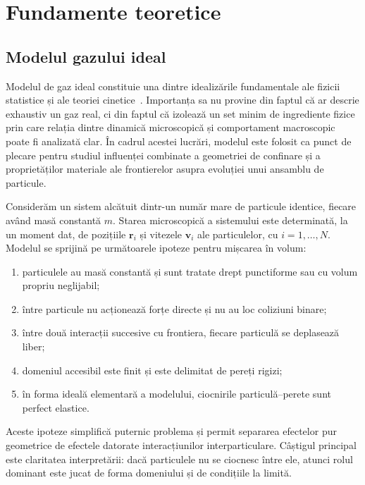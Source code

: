 \documentclass[12pt,openright,twoside]{book}
\begin{document}
\chapter{Fundamente teoretice}
\label{sec:fundamente}

\section{Modelul gazului ideal}

Modelul de gaz ideal constituie una dintre idealizările fundamentale ale fizicii statistice și ale teoriei cinetice~\cite{reif2009,cercignani1988,plavitu_termice,stefan_termice,ciobanu_statistica}. Importanța sa nu provine din faptul că ar descrie exhaustiv un gaz real, ci din faptul că izolează un set minim de ingrediente fizice prin care relația dintre dinamică microscopică și comportament macroscopic poate fi analizată clar. În cadrul acestei lucrări, modelul este folosit ca punct de plecare pentru studiul influenței combinate a geometriei de confinare și a proprietăților materiale ale frontierelor asupra evoluției unui ansamblu de particule.

Considerăm un sistem alcătuit dintr-un număr mare de particule identice, fiecare având masă constantă $m$. Starea microscopică a sistemului este determinată, la un moment dat, de pozițiile $\mathbf{r}_i$ și vitezele $\mathbf{v}_i$ ale particulelor, cu $i=1,\dots,N$. Modelul se sprijină pe următoarele ipoteze pentru mișcarea în volum:

\begin{enumerate}[label=\arabic*.]
    \item particulele au masă constantă și sunt tratate drept punctiforme sau cu volum propriu neglijabil;
    \item între particule nu acționează forțe directe și nu au loc coliziuni binare;
    \item între două interacții succesive cu frontiera, fiecare particulă se deplasează liber;
    \item domeniul accesibil este finit și este delimitat de pereți rigizi;
    \item în forma ideală elementară a modelului, ciocnirile particulă--perete sunt perfect elastice.
\end{enumerate}

Aceste ipoteze simplifică puternic problema și permit separarea efectelor pur geometrice de efectele datorate interacțiunilor interparticulare. Câștigul principal este claritatea interpretării: dacă particulele nu se ciocnesc între ele, atunci rolul dominant este jucat de forma domeniului și de condițiile la limită.
\end{document}
